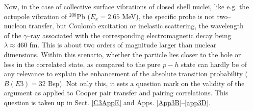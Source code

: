 Now, in the case of collective surface vibrations of closed shell nuclei, like e.g. the octupole vibration of $^{208}$Pb ($E_x=2.65$ MeV), the specific probe is not two--nucleon transfer, but Coulomb excitation or inelastic scattering,  the wavelength of the $\gamma$--ray associated with the corresponding electromagnetic decay being $\lambda\approx 460$ fm. This is about two orders of magnitude larger than nuclear dimensions. Within this scenario, whether  the particle lies closer to the hole or less in the correlated state, as compared to the pure $p-h$ state can hardly be of any relevance to explain  the enhancement of the absolute transition probability ($B(E3)=32$ Bsp). Not only this, it sets a question mark on the validity of the argument as applied to Cooper pair transfer and pairing correlations. This question is taken up in Sect.  
\ref{C3AppE} and Apps. \ref{App3B}--\ref{app3D}.







